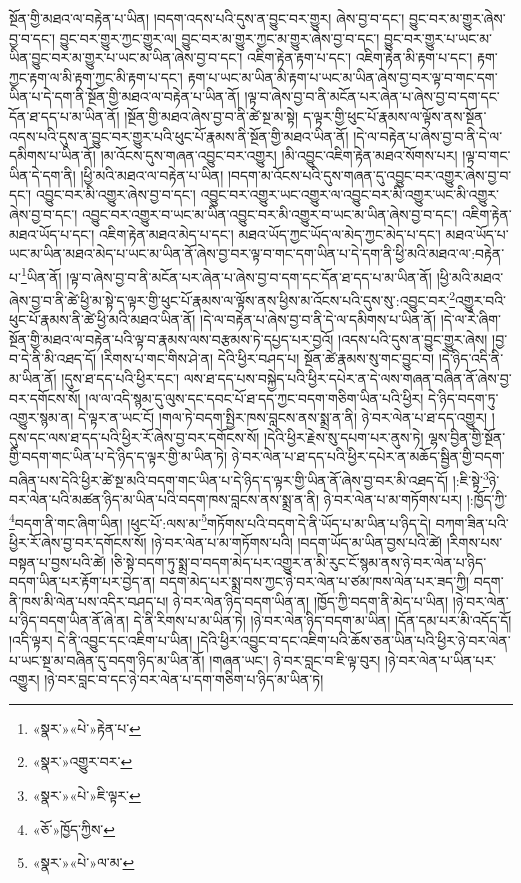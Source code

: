 སྔོན་གྱི་མཐའ་ལ་བརྟེན་པ་ཡིན། །བདག་འདས་པའི་དུས་ན་བྱུང་བར་གྱུར། ཞེས་བྱ་བ་དང་། བྱུང་བར་མ་གྱུར་ཞེས་བྱ་བ་དང་། བྱུང་བར་གྱུར་ཀྱང་གྱུར་ལ། བྱུང་བར་མ་གྱུར་ཀྱང་མ་གྱུར་ཞེས་བྱ་བ་དང་། བྱུང་བར་གྱུར་པ་ཡང་མ་ཡིན་བྱུང་བར་མ་གྱུར་པ་ཡང་མ་ཡིན་ཞེས་བྱ་བ་དང་། འཇིག་རྟེན་རྟག་པ་དང་། འཇིག་རྟེན་མི་རྟག་པ་དང་། རྟག་ཀྱང་རྟག་ལ་མི་རྟག་ཀྱང་མི་རྟག་པ་དང་། རྟག་པ་ཡང་མ་ཡིན་མི་རྟག་པ་ཡང་མ་ཡིན་ཞེས་བྱ་བར་ལྟ་བ་གང་དག་ཡིན་པ་དེ་དག་ནི་སྔོན་གྱི་མཐའ་ལ་བརྟེན་པ་ཡིན་ནོ། །ལྟ་བ་ཞེས་བྱ་བ་ནི་མངོན་པར་ཞེན་པ་ཞེས་བྱ་བ་དག་དང་དོན་ཐ་དད་པ་མ་ཡིན་ནོ། །སྔོན་གྱི་མཐའ་ཞེས་བྱ་བ་ནི་ཚེ་སྔ་མ་སྟེ། ད་ལྟར་གྱི་ཕུང་པོ་རྣམས་ལ་ལྟོས་ནས་སྔོན་འདས་པའི་དུས་ན་བྱུང་བར་གྱུར་པའི་ཕུང་པོ་རྣམས་ནི་སྔོན་གྱི་མཐའ་ཡིན་ནོ། །དེ་ལ་བརྟེན་པ་ཞེས་བྱ་བ་ནི་དེ་ལ་དམིགས་པ་ཡིན་ནོ། །མ་འོངས་དུས་གཞན་འབྱུང་བར་འགྱུར། །མི་འབྱུང་འཇིག་རྟེན་མཐའ་སོགས་པར། །ལྟ་བ་གང་ཡིན་དེ་དག་ནི། །ཕྱི་མའི་མཐའ་ལ་བརྟེན་པ་ཡིན། །བདག་མ་འོངས་པའི་དུས་གཞན་དུ་འབྱུང་བར་འགྱུར་ཞེས་བྱ་བ་དང་། འབྱུང་བར་མི་འགྱུར་ཞེས་བྱ་བ་དང་། འབྱུང་བར་འགྱུར་ཡང་འགྱུར་ལ་འབྱུང་བར་མི་འགྱུར་ཡང་མི་འགྱུར་ཞེས་བྱ་བ་དང་། འབྱུང་བར་འགྱུར་བ་ཡང་མ་ཡིན་འབྱུང་བར་མི་འགྱུར་བ་ཡང་མ་ཡིན་ཞེས་བྱ་བ་དང་། འཇིག་རྟེན་མཐའ་ཡོད་པ་དང་། འཇིག་རྟེན་མཐའ་མེད་པ་དང་། མཐའ་ཡོད་ཀྱང་ཡོད་ལ་མེད་ཀྱང་མེད་པ་དང་། མཐའ་ཡོད་པ་ཡང་མ་ཡིན་མཐའ་མེད་པ་ཡང་མ་ཡིན་ནོ་ཞེས་བྱ་བར་ལྟ་བ་གང་དག་ཡིན་པ་དེ་དག་ནི་ཕྱི་མའི་མཐའ་ལ་:བརྟེན་པ་\footnote{«སྣར་»«པེ་»རྟེན་པ་}ཡིན་ནོ། །ལྟ་བ་ཞེས་བྱ་བ་ནི་མངོན་པར་ཞེན་པ་ཞེས་བྱ་བ་དག་དང་དོན་ཐ་དད་པ་མ་ཡིན་ནོ། །ཕྱི་མའི་མཐའ་ཞེས་བྱ་བ་ནི་ཚེ་ཕྱི་མ་སྟེ་ད་ལྟར་གྱི་ཕུང་པོ་རྣམས་ལ་ལྟོས་ནས་ཕྱིས་མ་འོངས་པའི་དུས་སུ་:འབྱུང་བར་\footnote{«སྣར་»འགྱུར་བར་}འགྱུར་བའི་ཕུང་པོ་རྣམས་ནི་ཚེ་ཕྱི་མའི་མཐའ་ཡིན་ནོ། །དེ་ལ་བརྟེན་པ་ཞེས་བྱ་བ་ནི་དེ་ལ་དམིགས་པ་ཡིན་ནོ། །དེ་ལ་རེ་ཞིག་སྔོན་གྱི་མཐའ་ལ་བརྟེན་པའི་ལྟ་བ་རྣམས་ལས་བརྩམས་ཏེ་དཔྱད་པར་བྱའོ། །འདས་པའི་དུས་ན་བྱུང་གྱུར་ཞེས། །བྱ་བ་དེ་ནི་མི་འཐད་དོ། །རིགས་པ་གང་གིས་ཤེ་ན། དེའི་ཕྱིར་བཤད་པ། སྔོན་ཚེ་རྣམས་སུ་གང་བྱུང་བ། །དེ་ཉིད་འདི་ནི་མ་ཡིན་ནོ། །དུས་ཐ་དད་པའི་ཕྱིར་དང་། ལས་ཐ་དད་པས་བསྐྱེད་པའི་ཕྱིར་དཔེར་ན་དེ་ལས་གཞན་བཞིན་ནོ་ཞེས་བྱ་བར་དགོངས་སོ། །ལ་ལ་འདི་སྙམ་དུ་ལུས་དང་དབང་པོ་ཐ་དད་ཀྱང་བདག་གཅིག་ཡིན་པའི་ཕྱིར། དེ་ཉིད་བདག་ཏུ་འགྱུར་སྙམ་ན། དེ་ལྟར་ན་ཡང་ངོ། །གལ་ཏེ་བདག་སྤྱིར་ཁས་བླངས་ནས་སྨྲ་ན་ནི། ཉེ་བར་ལེན་པ་ཐ་དད་འགྱུར། །དུས་དང་ལས་ཐ་དད་པའི་ཕྱིར་རོ་ཞེས་བྱ་བར་དགོངས་སོ། །དེའི་ཕྱིར་རྗེས་སུ་དཔག་པར་ནུས་ཏེ། ལྷས་བྱིན་གྱི་སྔོན་གྱི་བདག་གང་ཡིན་པ་དེ་ཉིད་ད་ལྟར་གྱི་མ་ཡིན་ཏེ། ཉེ་བར་ལེན་པ་ཐ་དད་པའི་ཕྱིར་དཔེར་ན་མཆོད་སྦྱིན་གྱི་བདག་བཞིན་པས་དེའི་ཕྱིར་ཚེ་སྔ་མའི་བདག་གང་ཡིན་པ་དེ་ཉིད་ད་ལྟར་གྱི་ཡིན་ནོ་ཞེས་བྱ་བར་མི་འཐད་དོ། །:ཇི་སྟེ་\footnote{«སྣར་»«པེ་»ཇི་ལྟར་}ཉེ་བར་ལེན་པའི་མཚན་ཉིད་མ་ཡིན་པའི་བདག་ཁས་བླངས་ནས་སྨྲ་ན་ནི། ཉེ་བར་ལེན་པ་མ་གཏོགས་པར། །:ཁྱོད་ཀྱི་\footnote{«ཅོ་»ཁྱོད་ཀྱིས་}བདག་ནི་གང་ཞིག་ཡིན། །ཕུང་པོ་:ལས་མ་\footnote{«སྣར་»«པེ་»ལ་མ་}གཏོགས་པའི་བདག་དེ་ནི་ཡོད་པ་མ་ཡིན་པ་ཉིད་དེ། བཀག་ཟིན་པའི་ཕྱིར་རོ་ཞེས་བྱ་བར་དགོངས་སོ། །ཉེ་བར་ལེན་པ་མ་གཏོགས་པའི། །བདག་ཡོད་མ་ཡིན་བྱས་པའི་ཚེ། །རིགས་པས་བསྟན་པ་བྱས་པའི་ཚེ། །ཅི་སྟེ་བདག་ཏུ་སྨྲ་བ་བདག་མེད་པར་འགྱུར་ན་མི་རུང་ངོ་སྙམ་ནས་ཉེ་བར་ལེན་པ་ཉིད་བདག་ཡིན་པར་རྟོག་པར་བྱེད་ན། བདག་མེད་པར་སྨྲ་བས་ཀྱང་ཉེ་བར་ལེན་པ་ཙམ་ཁས་ལེན་པར་ཟད་ཀྱི། བདག་ནི་ཁས་མི་ལེན་པས་འདིར་བཤད་པ། ཉེ་བར་ལེན་ཉིད་བདག་ཡིན་ན། །ཁྱོད་ཀྱི་བདག་ནི་མེད་པ་ཡིན། །ཉེ་བར་ལེན་པ་ཉིད་བདག་ཡིན་ནོ་ཞེ་ན། དེ་ནི་རིགས་པ་མ་ཡིན་ཏེ། །ཉེ་བར་ལེན་ཉིད་བདག་མ་ཡིན། །དོན་དམ་པར་མི་འདོད་དོ། །འདི་ལྟར། དེ་ནི་འབྱུང་དང་འཇིག་པ་ཡིན། །དེའི་ཕྱིར་འབྱུང་བ་དང་འཇིག་པའི་ཆོས་ཅན་ཡིན་པའི་ཕྱིར་ཉེ་བར་ལེན་པ་ཡང་སྔ་མ་བཞིན་དུ་བདག་ཉིད་མ་ཡིན་ནོ། །གཞན་ཡང་། ཉེ་བར་བླང་བ་ཇི་ལྟ་བུར། །ཉེ་བར་ལེན་པ་ཡིན་པར་འགྱུར། །ཉེ་བར་བླང་བ་དང་ཉེ་བར་ལེན་པ་དག་གཅིག་པ་ཉིད་མ་ཡིན་ཏེ། 